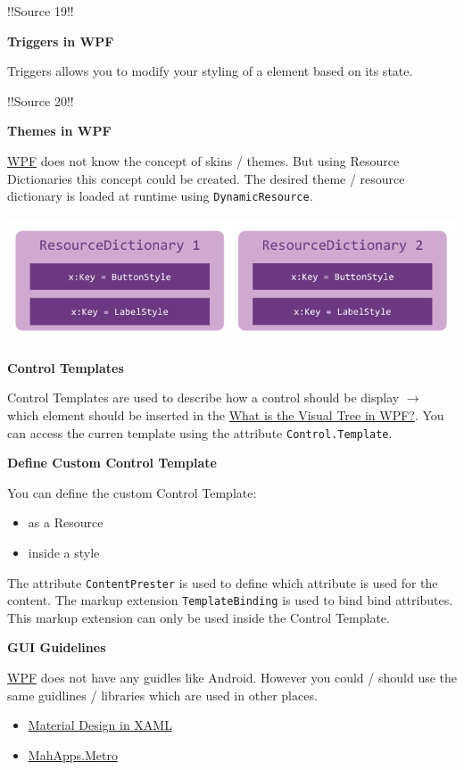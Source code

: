 \documentclass[10pt,twoside,landscape]{article}
\begin{document}
\begin{multicols}{3}
!!Source 19!!

\textbf{Triggers in WPF}

Triggers allows you to modify your styling of a element based on its state.

!!Source 20!!

\textbf{Themes in WPF}

\href{../../../roam/20211123162923-wpf.org}{WPF} does not know the concept of skins / themes.
But using Resource Dictionaries this concept could be created.
The desired theme / resource dictionary is loaded at runtime using \texttt{DynamicResource}.

\begin{center}
\includegraphics[width=.9\linewidth]{img/themes_in_wpf.png}
\end{center}


\textbf{Control Templates}

Control Templates are used to describe how a control should be display \(\rightarrow\) which element should be inserted in the \href{../../../roam/20211123163209-what_is_the_visual_tree_in_wpf.org}{What is the Visual Tree in WPF?}.
You can access the curren template using the attribute \texttt{Control.Template}.

\textbf{Define Custom Control Template}

You can define the custom Control Template:
\begin{itemize}
\item as a Resource
\item inside a style
\end{itemize}


The attribute \texttt{ContentPrester} is used to define which attribute is used for the content.
The markup extension \texttt{TemplateBinding} is used to bind bind attributes.
This markup extension can only be used inside the Control Template.

\textbf{GUI Guidelines}

\href{../../../roam/20211123162923-wpf.org}{WPF} does not have any guidles like Android.
However you could / should use the same guidlines / libraries which are used in other places.
\begin{itemize}
\item \href{https://github.com/MaterialDesignInXAML/MaterialDesignInXamlToolkit}{Material Design in XAML}
\item \href{https://mahapps.com/docs/guides/quick-start}{MahApps.Metro}
\end{itemize}


\end{multicols}
\end{document}
